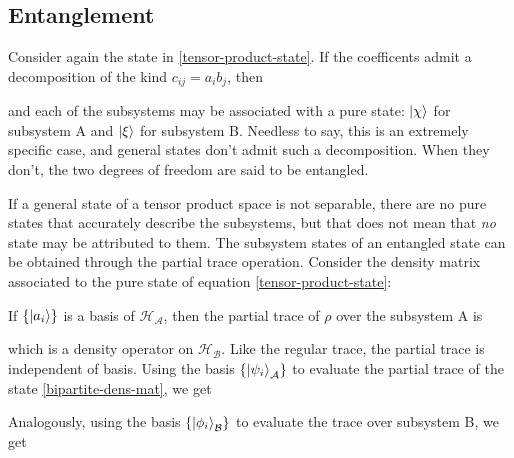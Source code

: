 \documentclass[12pt,a4paper,notitlepage]{report}
\begin{document}
\subsection{Entanglement}
\label{sec:entanglement}

Consider again the state in \eqref{tensor-product-state}. If the coefficents admit a decomposition of the kind $c_{ij} = a_ib_j$, then

%
and each of the subsystems may be associated with a pure state: $\ket{\chi}$ for subsystem A and $\ket{\xi}$ for subsystem B. Needless to say, this is an extremely specific case, and general states don't admit such a decomposition. When they don't, the two degrees of freedom are said to be entangled.

If a general state of a tensor product space is not separable, there are no pure states that accurately describe the subsystems, but that does not mean that {\it no} state may be attributed to them. The subsystem states of an entangled state can be obtained through the partial trace operation. Consider the density matrix associated to the pure state of equation \eqref{tensor-product-state}:

%
If $\{ \ket{a_i} \}$ is a basis of $\mathcal{H}_\mathcal{A}$, then the partial trace of $\rho$ over the subsystem A is

%
which is a density operator on $\mathcal{H}_\mathcal{B}$. Like the regular trace, the partial trace is independent of basis. Using the basis $\{ \ket{\psi_i}_\mathcal{A} \}$ to evaluate the partial trace of the state \eqref{bipartite-dens-mat}, we get

%
Analogously, using the basis $\{ \ket{\phi_i}_\mathcal{B} \}$ to evaluate the trace over subsystem B, we get
\end{document}
